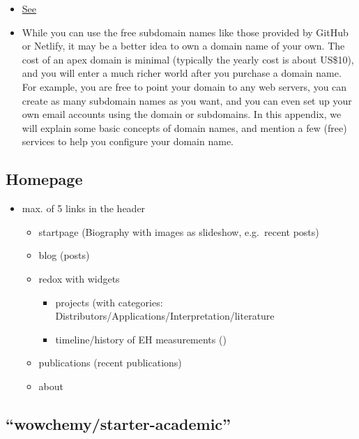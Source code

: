 \documentclass[
]{article}
\providecommand{\tightlist}{%
  \setlength{\itemsep}{0pt}\setlength{\parskip}{0pt}}
\begin{document}
\begin{itemize}
\tightlist
\item
  \href{https://bookdown.org/yihui/blogdown/domain-name.html}{See}
\item
  While you can use the free subdomain names like those provided by
  GitHub or Netlify, it may be a better idea to own a domain name of
  your own. The cost of an apex domain is minimal (typically the
  yearly cost is about US\$10), and you will enter a much richer world
  after you purchase a domain name. For example, you are free to point
  your domain to any web servers, you can create as many subdomain
  names as you want, and you can even set up your own email accounts
  using the domain or subdomains. In this appendix, we will explain
  some basic concepts of domain names, and mention a few (free)
  services to help you configure your domain name.
\end{itemize}

\hypertarget{homepage}{%
\subsection{Homepage}\label{homepage}}

\begin{itemize}
\item
  max. of 5 links in the header

  \begin{itemize}
  \item
    startpage (Biography with images as slideshow, e.g.~recent
    posts)
  \item
    blog (posts)
  \item
    redox with widgets

    \begin{itemize}
    \tightlist
    \item
      projects (with categories:
      Distributors/Applications/Interpretation/literature
    \item
      timeline/history of EH measurements ()
    \end{itemize}
  \item
    publications (recent publications)
  \item
    about
  \end{itemize}
\end{itemize}

\hypertarget{wowchemystarter-academic}{%
\subsection{``wowchemy/starter-academic''}\label{wowchemystarter-academic}}
\end{document}
